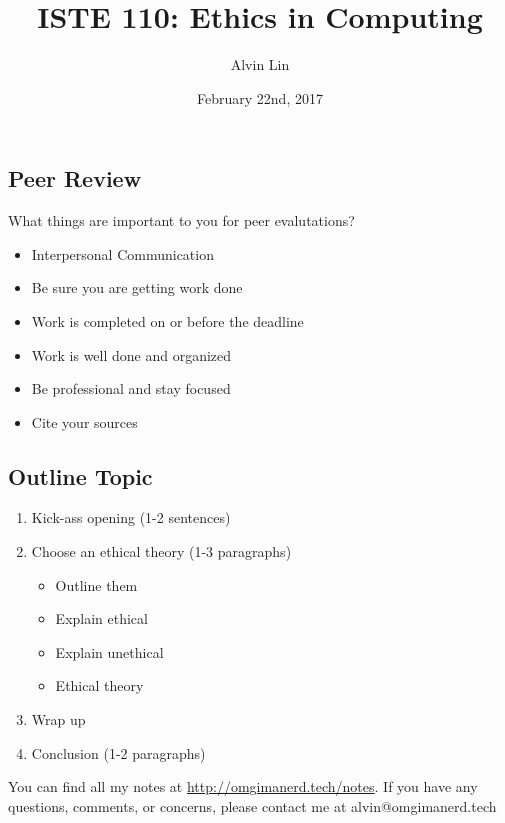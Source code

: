 \documentclass[letterpaper, 12pt]{article}
\title{ISTE 110: Ethics in Computing}
\author{Alvin Lin}
\date{February 22nd, 2017}
\begin{document}
\maketitle

\subsection*{Peer Review}
What things are important to you for peer evalutations?
\begin{itemize}
  \item Interpersonal Communication
  \item Be sure you are getting work done
  \item Work is completed on or before the deadline
  \item Work is well done and organized
  \item Be professional and stay focused
  \item Cite your sources
\end{itemize}

\subsection*{Outline Topic}
\begin{enumerate}
  \item Kick-ass opening (1-2 sentences)
  \item Choose an ethical theory (1-3 paragraphs)
  \begin{itemize}
    \item Outline them
    \item Explain ethical
    \item Explain unethical
    \item Ethical theory
  \end{itemize}
  \item Wrap up
  \item Conclusion (1-2 paragraphs)
\end{enumerate}

\begin{center}
  You can find all my notes at \url{http://omgimanerd.tech/notes}. If you have
  any questions, comments, or concerns, please contact me at
  alvin@omgimanerd.tech
\end{center}
\end{document}
